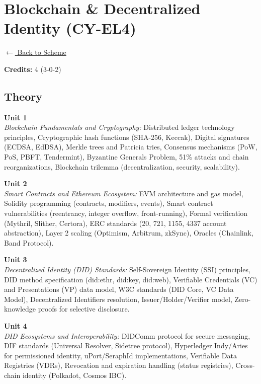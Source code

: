 \section*{Blockchain \& Decentralized Identity (CY-EL4)}
\label{elec:CY_4}

\noindent \small{\hyperref[main:scheme]{$\leftarrow$ Back to Scheme}} \vspace{0.5cm}

\noindent \textbf{Credits:} 4 (3-0-2)

\subsection*{Theory}
\noindent\textbf{Unit 1} \\
\textit{Blockchain Fundamentals and Cryptography:} Distributed ledger technology principles, Cryptographic hash functions (SHA-256, Keccak), Digital signatures (ECDSA, EdDSA), Merkle trees and Patricia tries, Consensus mechanisms (PoW, PoS, PBFT, Tendermint), Byzantine Generals Problem, 51\% attacks and chain reorganizations, Blockchain trilemma (decentralization, security, scalability).

\vspace{0.3cm}

\noindent\textbf{Unit 2} \\
\textit{Smart Contracts and Ethereum Ecosystem:} EVM architecture and gas model, Solidity programming (contracts, modifiers, events), Smart contract vulnerabilities (reentrancy, integer overflow, front-running), Formal verification (Mythril, Slither, Certora), ERC standards (20, 721, 1155, 4337 account abstraction), Layer 2 scaling (Optimism, Arbitrum, zkSync), Oracles (Chainlink, Band Protocol).

\vspace{0.3cm}

\noindent\textbf{Unit 3} \\
\textit{Decentralized Identity (DID) Standards:} Self-Sovereign Identity (SSI) principles, DID method specification (did:ethr, did:key, did:web), Verifiable Credentials (VC) and Presentations (VP) data model, W3C standards (DID Core, VC Data Model), Decentralized Identifiers resolution, Issuer/Holder/Verifier model, Zero-knowledge proofs for selective disclosure.

\vspace{0.3cm}

\noindent\textbf{Unit 4} \\
\textit{DID Ecosystems and Interoperability:} DIDComm protocol for secure messaging, DIF standards (Universal Resolver, Sidetree protocol), Hyperledger Indy/Aries for permissioned identity, uPort/SeraphId implementations, Verifiable Data Registries (VDRs), Revocation and expiration handling (status registries), Cross-chain identity (Polkadot, Cosmos IBC).


